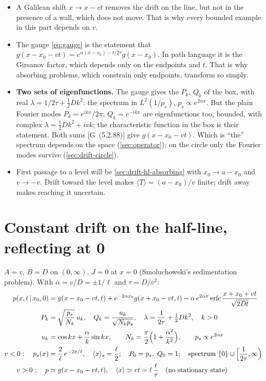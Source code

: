 \documentclass[11pt]{article}
\numberwithin{equation}{section}
\newcommand{\avg}[1]{\langle #1\rangle}
\newcommand{\given}{\,|\,}
\newcommand{\G}[1]{[G~(#1)]}
\begin{document}
\begin{itemize}
  \item A Galilean shift $x\to x-vt$ removes the drift on the line, but not in the presence of a wall,
        which does not move. That is why every bounded example in this part depends on $v$.
  \item The gauge \cref{eq:gauge} is the statement that $g(x-x_0-vt)=e^{\alpha(x-x_0)-t/2\tau}g(x-x_0)$. In
        path language it is the Girsanov factor, which depends only on the endpoints and $t$. That is why
        absorbing problems, which constrain only endpoints, transform so simply.
  \item \textbf{Two sets of eigenfunctions.} The gauge gives the $P_k$, $Q_k$ of the box, with real
        $\lambda=1/2\tau+\tfrac12Dk^2$: the spectrum in $L^2(1/p_s)$, $p_s\propto e^{2\alpha x}$. But the plain
        Fourier modes $P_k=e^{ikx}/2\pi$, $Q_k=e^{-ikx}$ are eigenfunctions too, bounded, with complex
        $\lambda=\tfrac12Dk^2+ivk$; the characteristic function in the box is their statement. Both sums
        \G{5.2.88} give $g(x-x_0-vt)$. Which is ``the'' spectrum depends on the space (\cref{sec:operator}); on the
        circle only the Fourier modes survive (\cref{sec:drift-circle}).
  \item First passage to a level will be \cref{sec:drift-hl-absorbing} with $x_0\to a-x_0$ and $v\to-v$.
        Drift toward the level makes $\avg T=(a-x_0)/v$ finite; drift away makes reaching it uncertain.
\end{itemize}

\section{Constant drift on the half-line, reflecting at 0}
\label{sec:drift-hl-reflecting}

\begin{keyresults}
$A=v$, $B=D$ on $(0,\infty)$, $J=0$ at $x=0$ (Smoluchowski's sedimentation problem). With
$\alpha=v/D=\pm1/\ell$ and $\tau=D/v^2$:
\begin{align}
  p(x,t\given x_0,0) &= g(x-x_0-vt,t)+e^{-2\alpha x_0}g(x+x_0-vt,t)
  -\alpha\,e^{2\alpha x}\operatorname{erfc}\frac{x+x_0+vt}{\sqrt{2Dt}} \label{eq:DHR-prop}\\
  P_k &= \sqrt{\frac{p_s}{N_k}}\,u_k,\quad Q_k=\frac{u_k}{\sqrt{N_kp_s}},\quad \lambda=\frac1{2\tau}+\tfrac12Dk^2,
  \quad k>0 \\
  u_k &= \cos kx+\frac\alpha k\sin kx,\qquad N_k=\frac\pi2\Bigl(1+\frac{\alpha^2}{k^2}\Bigr),\qquad
  p_s\propto e^{2\alpha x} \\
  v<0:\quad p_s(x) &= \frac2\ell\,e^{-2x/\ell},\quad \avg x_s=\frac\ell2;\quad P_0=p_s,\ Q_0=1;\quad
  \text{spectrum } \{0\}\cup\Bigl[\frac1{2\tau},\infty\Bigr) \\
  v>0:\quad p &\simeq g(x-x_0-vt,t),\quad \avg{x}\simeq vt=\ell\,\frac t\tau\quad\text{(no stationary state)}
\end{align}
\end{keyresults}
\end{document}
